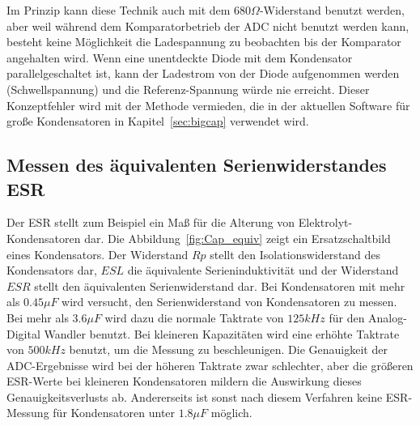 Im Prinzip kann diese Technik auch mit dem \(680\Omega\)-Widerstand benutzt werden,
aber weil während dem Komparatorbetrieb der ADC nicht benutzt werden kann, besteht keine
Möglichkeit die Ladespannung zu beobachten bis der Komparator angehalten wird.
Wenn eine unentdeckte Diode mit dem Kondensator parallelgeschaltet ist, kann der Ladestrom
von der Diode aufgenommen werden (Schwellspannung) und die Referenz-Spannung würde nie erreicht.
Dieser Konzeptfehler wird mit der Methode vermieden, die in der aktuellen Software für große Kondensatoren in Kapitel~\ref{sec:bigcap}
verwendet wird.

\subsection{Messen des äquivalenten Serienwiderstandes ESR}
Der ESR \cite{ESR} stellt zum Beispiel ein Maß für die Alterung von Elektrolyt-Kondensatoren dar.
Die Abbildung~\ref{fig:Cap_equiv} zeigt ein Ersatzschaltbild eines Kondensators.
Der Widerstand \(Rp\) stellt den Isolationswiderstand des Kondensators dar, \(ESL\) die äquivalente
Serieninduktivität und der Widerstand \(ESR\) stellt den äquivalenten Serienwiderstand dar.
Bei Kondensatoren mit mehr als \(0.45 \mu F\) wird versucht, den Serienwiderstand von Kondensatoren zu messen.
Bei mehr als \(3.6 \mu F\) wird dazu die normale Taktrate von \(125 kHz\) für den Analog-Digital Wandler benutzt.
Bei kleineren Kapazitäten wird eine erhöhte Taktrate von \(500 kHz\) benutzt, um die Messung zu beschleunigen.
Die Genauigkeit der ADC-Ergebnisse wird bei der höheren Taktrate zwar schlechter, aber die größeren ESR-Werte
bei kleineren Kondensatoren mildern die Auswirkung dieses Genauigkeitsverlusts ab. 
Andererseits ist sonst nach diesem Verfahren keine ESR-Messung für Kondensatoren unter \(1.8 \mu F\) möglich.

